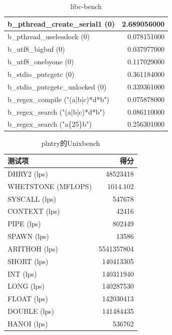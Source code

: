 \begin{table}[H]
\begin{tabular}{|l|r|}
        \hline
        b\_pthread\_create\_serial1 (0) & 2.689056000 \\
        \hline
        b\_pthread\_uselesslock (0) & 0.078151000 \\
        \hline
        b\_utf8\_bigbuf (0) & 0.037977000 \\
        \hline
        b\_utf8\_onebyone (0) & 0.117029000 \\
        \hline
        b\_stdio\_putcgetc (0) & 0.361184000 \\
        \hline
        b\_stdio\_putcgetc\_unlocked (0) & 0.339361000 \\
        \hline
        b\_regex\_compile ("(a|b|c)*d*b") & 0.075878000 \\
        \hline
        b\_regex\_search ("(a|b|c)*d*b") & 0.086110000 \\
        \hline
        b\_regex\_search ("a\{25\}b") & 0.256301000 \\
        \hline
    \end{tabular}
    \caption{libc-bench}
\end{table}

\begin{table}[H]
    \centering
    \begin{tabular}{|l|r|}
    \hline
        测试项 & 得分 \\
        \hline
        DHRY2 (lps) & 48523418 \\
        \hline
        WHETSTONE (MFLOPS) & 1014.102 \\
        \hline
        SYSCALL (lps) & 547678 \\
        \hline
        CONTEXT (lps) & 42416 \\
        \hline
        PIPE (lps) & 802449 \\
        \hline
        SPAWN (lps) & 13586 \\
        \hline
        ARITHOH (lps) & 5541357804 \\
        \hline
        SHORT (lps) & 140413305 \\
        \hline
        INT (lps) & 140311940 \\
        \hline
        LONG (lps) & 140287530 \\
        \hline
        FLOAT (lps) & 142030413 \\
        \hline
        DOUBLE (lps) & 141484435 \\
        \hline
        HANOI (lps) & 536762 \\
    \hline
    \end{tabular}
    \caption{plntry的Unixbench}
    \label{tab:unixbench}
\end{table}

